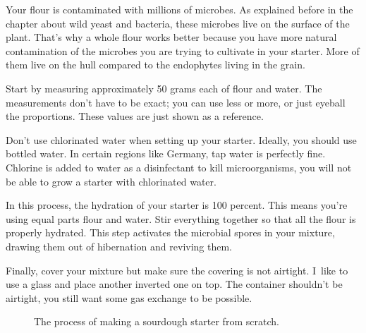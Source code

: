 Your flour is contaminated with millions of microbes. As explained
before in the chapter about wild yeast and bacteria, these
microbes live on the surface of the plant. That's why
a whole flour works better because you have more natural
contamination of the microbes you are trying to cultivate
in your starter. More of them live on the hull compared to the
endophytes living in the grain.

Start by measuring approximately 50 grams each of flour and
water. The measurements don't have to be exact; you can use
less or more, or just eyeball the proportions. These
values are just shown as a reference.

Don't use chlorinated water when setting up your starter.
Ideally, you should use bottled water. In certain regions
like Germany, tap water is perfectly fine. Chlorine is added
to water as a disinfectant to kill microorganisms, you will
not be able to grow a starter with chlorinated water.

In this process, the hydration of your starter is 100
percent. This means you're using equal parts flour and
water. Stir everything together so that all the flour is
properly hydrated. This step activates the microbial spores
in your mixture, drawing them out of hibernation and
reviving them.

Finally, cover your mixture but make sure the covering is
not airtight. I~like to use a glass and place another
inverted one on top. The container shouldn't be airtight,
you still want some gas exchange to be possible.

\begin{figure}[!htb]
\begin{center}
  
  \caption{The process of making a sourdough starter from scratch.}%
  \label{fig:sourdough-starter-process}
\end{center}
\end{figure}

